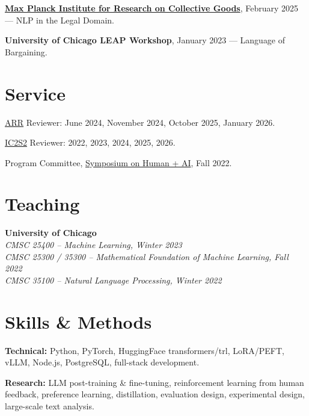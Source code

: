\documentclass[11pt,letterpaper]{article}
\begin{document}
\href{https://www.coll.mpg.de}{\textbf{Max Planck Institute for Research on Collective Goods}}, February 2025 --- NLP in the Legal Domain.

\vspace{4pt}

\textbf{University of Chicago LEAP Workshop}, January 2023 --- Language of Bargaining.

\section*{Service}

\begin{cvitems}
    \item \href{https://aclrollingreview.org}{ARR} Reviewer: June 2024, November 2024, October 2025, January 2026.
    \item \href{https://ic2s2-2026.org}{IC2S2} Reviewer: 2022, 2023, 2024, 2025, 2026.
    \item Program Committee, \href{https://datascience.uchicago.edu/events/human-ai-conference/}{Symposium on Human + AI}, Fall 2022.
\end{cvitems}

\section*{Teaching}

\textbf{University of Chicago}\\
\hspace*{2em}\textit{CMSC 25400 -- Machine Learning, Winter 2023}\\
\hspace*{2em}\textit{CMSC 25300 / 35300 -- Mathematical Foundation of Machine Learning, Fall 2022}\\
\hspace*{2em}\textit{CMSC 35100 -- Natural Language Processing, Winter 2022}

\section*{Skills \& Methods}
\begin{cvitems}
    \item \textbf{Technical:} Python, PyTorch, HuggingFace transformers/trl, LoRA/PEFT, vLLM, Node.js, PostgreSQL, full-stack development.
    \item \textbf{Research:} LLM post-training \& fine-tuning, reinforcement learning from human feedback, preference learning, distillation, evaluation design, experimental design, large-scale text analysis.
\end{cvitems}
\end{document}
